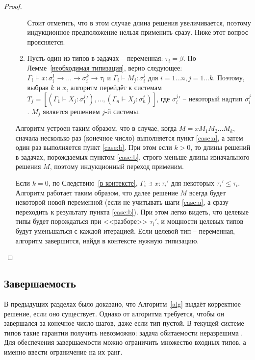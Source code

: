\documentclass[../main.tex]{subfiles}
\begin{document}
\begin{proof}
\begin{enumerate}
\begin{enumerate}
            Стоит отметить, что в этом случае длина решения увеличивается, поэтому индукционное предположение нельзя применить сразу. Ниже этот вопрос проясняется.
            
            \item \label{case:b} Пусть один из типов в задачах -- переменная: $\tau_i = \beta$. По Лемме~\ref{необходимая типизация}, верно следующее: $\Gamma_i \vdash x \colon \sigma_i^1 \to \dots \to \sigma_i^k \to \tau_i \text{ и } \Gamma_i \vdash M_j \colon \sigma_i^j \text{ для } i = 1 \dots n, j = 1 \dots k$. 
            Поэтому, выбрав $k$ и $x$, алгоритм перейдёт к системам $T_j = [(\Gamma_1 \vdash X_j : \sigma_1^j') ,\dots, (\Gamma_n \vdash X_j : \sigma_n^j)]$, где $\sigma_i^j'$ -- некоторый надтип $\sigma_i^j$. $M_j$ является решением $j$-й системы.
        \end{enumerate}
        
        Алгоритм устроен таким образом, что в случае, когда $M = x M_1 M_2 \dots M_k$, сначала несколько раз (конечное число) выполняется пункт \ref{case:a}, а затем один раз выполняется пункт \ref{case:b}. При этом если $k > 0$, то длины решений в задачах, порождаемых пунктом \ref{case:b}, строго меньше длины изначального решения $M$, поэтому индукционный переход применим. 
        
        Если $k = 0$, по Следствию~\ref{в контексте}, $\Gamma_i \ni x \colon \tau_i'$ для некоторых $\tau_i' \leqslant \tau_i$. Алгоритм работает таким образом, что далее решение $M$ всегда будет некоторой новой переменной (если не учитывать шаги \ref{case:a}, а сразу переходить к результату пункта \ref{case:b}). При этом легко видеть, что целевые типы будет порождаться при <<разборе>> $\tau_i'$, и мощности целевых типов будут уменьшаться с каждой итерацией. Если целевой тип -- переменная, алгоритм завершится, найдя в контексте нужную типизацию.
        
\end{enumerate}

\end{proof}

\subsection{Завершаемость}
В предыдущих разделах было доказано, что Алгоритм~\ref{alg} выдаёт корректное решение, если оно существует. Однако от алгоритма требуется, чтобы он завершался за конечное число шагов, даже если тип пустой. В текущей системе типов такие гарантии получить невозможно: задача обитаемости неразрешима \cite{urzyczyn_1999}. 
Для обеспечения завершаемости можно ограничить множество входных типов, а именно ввести ограничение на их ранг. 
\end{document}
